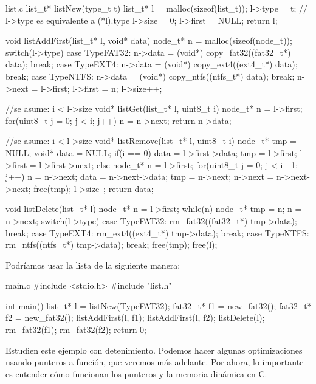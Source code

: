 \documentclass[]{scrartcl}
\begin{document}
\begin{cbox}[breakable]{list.c}
  list_t* listNew(type_t t) {
    list_t* l = malloc(sizeof(list_t));
    l->type = t;  // l->type es equivalente a (*l).type
    l->size = 0;
    l->first = NULL;
    return l;
  }

  void listAddFirst(list_t* l, void* data) {
    node_t* n = malloc(sizeof(node_t));
    switch(l->type) {
      case TypeFAT32:
        n->data = (void*) copy_fat32((fat32_t*) data);
        break;
      case TypeEXT4:
        n->data = (void*) copy_ext4((ext4_t*) data);
        break;
      case TypeNTFS:
        n->data = (void*) copy_ntfs((ntfs_t*) data);
        break;
    }
    n->next = l->first;
    l->first = n;
    l->size++;
  }

  //se asume: i < l->size
  void* listGet(list_t* l, uint8_t i){
    node_t* n = l->first;
    for(uint8_t j = 0; j < i; j++)
      n = n->next;
    return n->data;
  }

  //se asume: i < l->size
  void* listRemove(list_t* l, uint8_t i){
    node_t* tmp = NULL;
    void* data = NULL;
    if(i == 0){
      data = l->first->data;
      tmp = l->first;
      l->first = l->first->next;
    }else{
      node_t* n = l->first;
      for(uint8_t j = 0; j < i - 1; j++)
        n = n->next;
      data = n->next->data;
      tmp = n->next;
      n->next = n->next->next;
    }
    free(tmp);
    l->size--;
    return data;
  }

  void listDelete(list_t* l){
    node_t* n = l->first;
    while(n){
      node_t* tmp = n;
      n = n->next;
      switch(l->type) {
        case TypeFAT32:
          rm_fat32((fat32_t*) tmp->data);
          break;
        case TypeEXT4:
          rm_ext4((ext4_t*) tmp->data);
          break;
        case TypeNTFS:
          rm_ntfs((ntfs_t*) tmp->data);
          break;
      }
      free(tmp);
    }
    free(l);
  }
\end{cbox}

Podríamos usar la lista de la siguiente manera:

\begin{cbox}[]{main.c}
  #include <stdio.h>
  #include "list.h"

  int main() {
    list_t* l = listNew(TypeFAT32);
    fat32_t* f1 = new_fat32();
    fat32_t* f2 = new_fat32();
    listAddFirst(l, f1);
    listAddFirst(l, f2);
    listDelete(l);
    rm_fat32(f1);
    rm_fat32(f2);
    return 0;
  }
\end{cbox}

Estudien este ejemplo con detenimiento. Podemos hacer algunas optimizaciones usando punteros a función, que veremos más adelante. Por ahora, lo importante es entender cómo funcionan los punteros y la memoria dinámica en C.
\end{document}
